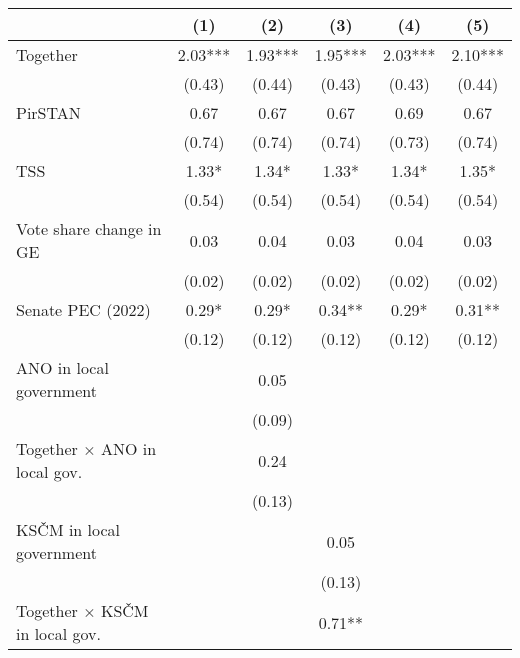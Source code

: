 \begin{tabular}[t]{lccccc}
\toprule
  & (1) & (2) & (3) & (4) & (5) \\
\midrule

Together                                & \num{2.03}***  & \num{1.93}***  & \num{1.95}***  & \num{2.03}***  & \num{2.10}***  \\
& (\num{0.43})   & (\num{0.44})   & (\num{0.43})   & (\num{0.43})   & (\num{0.44})   \\
PirSTAN                                 & \num{0.67}     & \num{0.67}     & \num{0.67}     & \num{0.69}     & \num{0.67}     \\
& (\num{0.74})   & (\num{0.74})   & (\num{0.74})   & (\num{0.73})   & (\num{0.74})   \\
TSS                                     & \num{1.33}*    & \num{1.34}*    & \num{1.33}*    & \num{1.34}*    & \num{1.35}*    \\
& (\num{0.54})   & (\num{0.54})   & (\num{0.54})   & (\num{0.54})   & (\num{0.54})   \\
Vote share change in GE                 & \num{0.03}    & \num{0.04}    & \num{0.03}    & \num{0.04}    & \num{0.03}     \\
& (\num{0.02})   & (\num{0.02})   & (\num{0.02})   & (\num{0.02})   & (\num{0.02})   \\
Senate PEC (2022)                       & \num{0.29}*    & \num{0.29}*    & \num{0.34}**   & \num{0.29}*    & \num{0.31}**   \\
& (\num{0.12})   & (\num{0.12})   & (\num{0.12})   & (\num{0.12})   & (\num{0.12})   \\
ANO in local government                 &                 & \num{0.05}     &                 &                 &                 \\
&                 & (\num{0.09})   &                 &                 &                 \\
Together × ANO in local gov.            &                 & \num{0.24}    &                 &                 &                 \\
&                 & (\num{0.13})   &                 &                 &                 \\
KSČM in local government                &                 &                 & \num{0.05}     &                 &                 \\
&                 &                 & (\num{0.13})   &                 &                 \\
Together × KSČM in local gov.           &                 &                 & \num{0.71}**   &                 &                 \\

\end{tabular}
